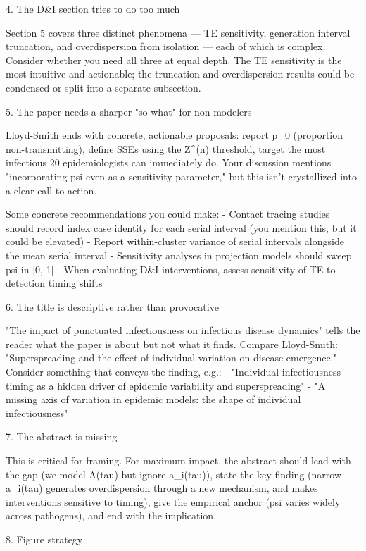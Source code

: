   4. The D&I section tries to do too much

  Section 5 covers three distinct phenomena --- TE sensitivity, generation interval truncation, and
  overdispersion from isolation --- each of which is complex. Consider whether you need all three at
  equal depth. The TE sensitivity is the most intuitive and actionable; the truncation and
  overdispersion results could be condensed or split into a separate subsection.

  5. The paper needs a sharper "so what" for non-modelers

  Lloyd-Smith ends with concrete, actionable proposals: report p_0 (proportion non-transmitting),
  define SSEs using the Z^(n) threshold, target the most infectious 20%
  epidemiologists can immediately do. Your discussion mentions "incorporating psi even as a
  sensitivity parameter," but this isn't crystallized into a clear call to action.

  Some concrete recommendations you could make:
  - Contact tracing studies should record index case identity for each serial interval (you mention
  this, but it could be elevated)
  - Report within-cluster variance of serial intervals alongside the mean serial interval
  - Sensitivity analyses in projection models should sweep psi in [0, 1]
  - When evaluating D&I interventions, assess sensitivity of TE to detection timing shifts

  6. The title is descriptive rather than provocative

  "The impact of punctuated infectiousness on infectious disease dynamics" tells the reader what the
  paper is about but not what it finds. Compare Lloyd-Smith: "Superspreading and the effect of
  individual variation on disease emergence." Consider something that conveys the finding, e.g.:
  - "Individual infectiousness timing as a hidden driver of epidemic variability and superspreading"
  - "A missing axis of variation in epidemic models: the shape of individual infectiousness"

  7. The abstract is missing

  This is critical for framing. For maximum impact, the abstract should lead with the gap (we model
  A(tau) but ignore a_i(tau)), state the key finding (narrow a_i(tau) generates overdispersion
  through a new mechanism, and makes interventions sensitive to timing), give the empirical anchor
  (psi varies widely across pathogens), and end with the implication.

  8. Figure strategy

